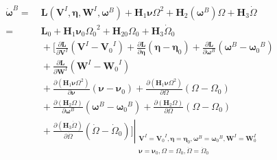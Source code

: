 \begin{equation}
	\begin{aligned}
	   {{{\boldsymbol{\dot{\omega }}}}^{B}}= &\ \boldsymbol{L}({{\boldsymbol{V}}^{I}},\boldsymbol{\eta },{{\boldsymbol{W}}^{I}},{{\boldsymbol{\omega }}^{B}})+{{\boldsymbol{H}}_{1}}\boldsymbol{\nu }{{\Omega }^{2}}+{{\boldsymbol{H}}_{2}}({{\boldsymbol{\omega }}^{B}})\Omega +{{\boldsymbol{H}}_{3}}\dot{\Omega } \\ 
	  = &\ {{\boldsymbol{L}}_{0}}+{{\boldsymbol{H}}_{1}}{{\boldsymbol{\nu }}_{0}}{{\Omega }_{0}}^{2}+{{\boldsymbol{H}}_{20}}{{\Omega }_{0}}+{{\boldsymbol{H}}_{3}}{{{\dot{\Omega }}}_{0}} \\ 
	   &\ +[\frac{\partial \boldsymbol{L}}{\partial {{\boldsymbol{V}}^{I}}}({{\boldsymbol{V}}^{I}}-{{\boldsymbol{V}}_{0}}^{I})+\frac{\partial \boldsymbol{L}}{\partial \boldsymbol{\eta }}(\boldsymbol{\eta }-{{\boldsymbol{\eta }}_{0}})+\frac{\partial \boldsymbol{L}}{\partial {{\boldsymbol{\omega }}^{B}}}({{\boldsymbol{\omega }}^{B}}-{{\boldsymbol{\omega }}_{0}}^{B}) \\ 
	   &\ +\frac{\partial \boldsymbol{L}}{\partial {{\boldsymbol{W}}^{I}}}({{\boldsymbol{W}}^{I}}-{{\boldsymbol{W}}_{0}}^{I}) \\ 
	   &\ +\frac{\partial ({{\boldsymbol{H}}_{1}}\boldsymbol{\nu }{{\Omega }^{2}})}{\partial \boldsymbol{\nu }}(\boldsymbol{\nu }-{{\boldsymbol{\nu }}_{0}})+\frac{\partial ({{\boldsymbol{H}}_{1}}\boldsymbol{\nu }{{\Omega }^{2}})}{\partial \Omega }(\Omega -{{\Omega }_{0}}) \\ 
	   &\ +\frac{\partial ({{\boldsymbol{H}}_{2}}\Omega )}{\partial {{\boldsymbol{\omega }}^{B}}}({{\boldsymbol{\omega }}^{B}}-{{\boldsymbol{\omega }}_{0}}^{B})+\frac{\partial ({{\boldsymbol{H}}_{2}}\Omega )}{\partial \Omega }(\Omega -{{\Omega }_{0}}) \\ 
	   &\ +{{\left. \frac{\partial ({{\boldsymbol{H}}_{3}}\dot{\Omega })}{\partial \dot{\Omega }}(\dot{\Omega }-{{{\dot{\Omega }}}_{0}})] \right|}_{\begin{smallmatrix} 
	 {{\boldsymbol{V}}^{I}}={{\boldsymbol{V}}_{0}}^{I},\boldsymbol{\eta }={{\boldsymbol{\eta }}_{0}},{{\boldsymbol{\omega }}^{B}}={{\boldsymbol{\omega }}_{0}}^{B},{{\boldsymbol{W}}^{I}}=\boldsymbol{W}_{0}^{I} \\ 
	 \boldsymbol{\nu }={{\boldsymbol{\nu }}_{0}},\Omega ={{\Omega }_{0}},\dot{\Omega }={{{\dot{\Omega }}}_{0}} 
	\end{smallmatrix}}}
	\end{aligned}
	\label{eq_19}
\end{equation}

